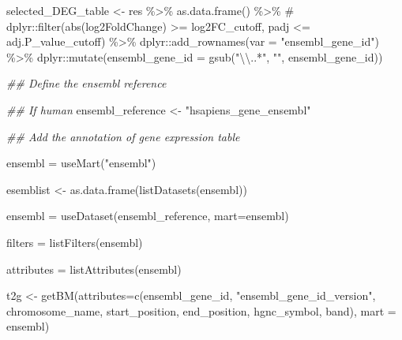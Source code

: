 \documentclass[
  letterpaper,
  DIV=11,
  numbers=noendperiod]{scrreprt}
\newenvironment{Shaded}{\begin{snugshade}}{\end{snugshade}}
\newcommand{\AttributeTok}[1]{\textcolor[rgb]{0.40,0.45,0.13}{#1}}
\newcommand{\CommentTok}[1]{\textcolor[rgb]{0.37,0.37,0.37}{#1}}
\newcommand{\DocumentationTok}[1]{\textcolor[rgb]{0.37,0.37,0.37}{\textit{#1}}}
\newcommand{\FunctionTok}[1]{\textcolor[rgb]{0.28,0.35,0.67}{#1}}
\newcommand{\NormalTok}[1]{\textcolor[rgb]{0.00,0.23,0.31}{#1}}
\newcommand{\OtherTok}[1]{\textcolor[rgb]{0.00,0.23,0.31}{#1}}
\newcommand{\SpecialCharTok}[1]{\textcolor[rgb]{0.37,0.37,0.37}{#1}}
\newcommand{\StringTok}[1]{\textcolor[rgb]{0.13,0.47,0.30}{#1}}
\begin{document}
\begin{codelisting}
\begin{Shaded}
\begin{Highlighting}[]
\NormalTok{selected\_DEG\_table }\OtherTok{\textless{}{-}}\NormalTok{ res }\SpecialCharTok{\%\textgreater{}\%} \FunctionTok{as.data.frame}\NormalTok{() }\SpecialCharTok{\%\textgreater{}\%}
\CommentTok{\#  dplyr::filter(abs(log2FoldChange) \textgreater{}= log2FC\_cutoff, padj \textless{}= adj.P\_value\_cutoff) \%\textgreater{}\%}
\NormalTok{  dplyr}\SpecialCharTok{::}\FunctionTok{add\_rownames}\NormalTok{(}\AttributeTok{var =} \StringTok{"ensembl\_gene\_id"}\NormalTok{) }\SpecialCharTok{\%\textgreater{}\%}
\NormalTok{  dplyr}\SpecialCharTok{::}\FunctionTok{mutate}\NormalTok{(}\AttributeTok{ensembl\_gene\_id =} \FunctionTok{gsub}\NormalTok{(}\StringTok{"}\SpecialCharTok{\textbackslash{}\textbackslash{}}\StringTok{..*"}\NormalTok{, }\StringTok{""}\NormalTok{, ensembl\_gene\_id))}

\DocumentationTok{\#\# Define the ensembl reference }


\DocumentationTok{\#\# If human}
\NormalTok{ensembl\_reference }\OtherTok{\textless{}{-}} \StringTok{"hsapiens\_gene\_ensembl"}

\DocumentationTok{\#\# Add the annotation of gene expression table}

\NormalTok{ensembl }\OtherTok{=} \FunctionTok{useMart}\NormalTok{(}\StringTok{"ensembl"}\NormalTok{)}

\NormalTok{esemblist }\OtherTok{\textless{}{-}} \FunctionTok{as.data.frame}\NormalTok{(}\FunctionTok{listDatasets}\NormalTok{(ensembl))}

\NormalTok{ensembl }\OtherTok{=} \FunctionTok{useDataset}\NormalTok{(ensembl\_reference, }\AttributeTok{mart=}\NormalTok{ensembl)}

\NormalTok{filters }\OtherTok{=} \FunctionTok{listFilters}\NormalTok{(ensembl)}

\NormalTok{attributes }\OtherTok{=} \FunctionTok{listAttributes}\NormalTok{(ensembl)}

\NormalTok{t2g }\OtherTok{\textless{}{-}} \FunctionTok{getBM}\NormalTok{(}\AttributeTok{attributes=}\FunctionTok{c}\NormalTok{(}\StringTok{\textquotesingle{}ensembl\_gene\_id\textquotesingle{}}\NormalTok{,}
                          \StringTok{"ensembl\_gene\_id\_version"}\NormalTok{,}
                          \StringTok{\textquotesingle{}chromosome\_name\textquotesingle{}}\NormalTok{,}
                          \StringTok{\textquotesingle{}start\_position\textquotesingle{}}\NormalTok{,}
                          \StringTok{\textquotesingle{}end\_position\textquotesingle{}}\NormalTok{, }
                          \StringTok{\textquotesingle{}hgnc\_symbol\textquotesingle{}}\NormalTok{, }
                          \StringTok{\textquotesingle{}band\textquotesingle{}}\NormalTok{), }\AttributeTok{mart =}\NormalTok{ ensembl)}


\end{Highlighting}
\end{Shaded}
\end{codelisting}
\end{document}
